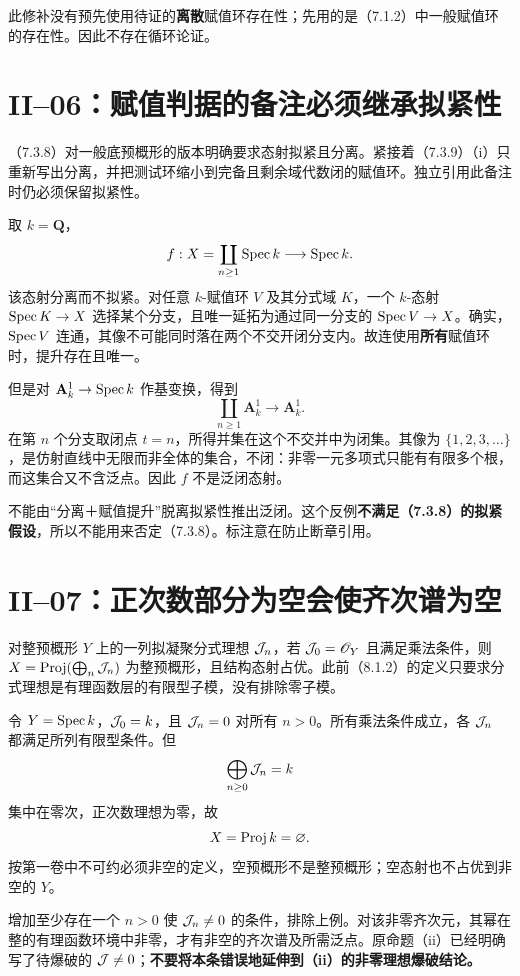 此修补没有预先使用待证的\textbf{离散}赋值环存在性；先用的是（7.1.2）中一般赋值环的存在性。因此不存在循环论证。

\section{II--06：赋值判据的备注必须继承拟紧性}
（7.3.8）对一般底预概形的版本明确要求态射拟紧且分离。紧接着（7.3.9）（i）只重新写出分离，并把测试环缩小到完备且剩余域代数闭的赋值环。独立引用此备注时仍必须保留拟紧性。
\begin{analysisproof}
取 $k=\mathbf Q$，
\[
f:X=\coprod_{n\ge1}\operatorname{Spec} k\longrightarrow\operatorname{Spec} k.
\]
该态射分离而不拟紧。对任意 $k$-赋值环 $V$ 及其分式域 $K$，一个 $k$-态射 $\operatorname{Spec} K\to X$ 选择某个分支，且唯一延拓为通过同一分支的 $\operatorname{Spec} V\to X$。确实，$\operatorname{Spec} V$ 连通，其像不可能同时落在两个不交开闭分支内。故连使用\textbf{所有}赋值环时，提升存在且唯一。

但是对 $\mathbf A^1_k\to\operatorname{Spec} k$ 作基变换，得到
\[
\coprod_{n\ge1}\mathbf A^1_k\longrightarrow\mathbf A^1_k.
\]
在第 $n$ 个分支取闭点 $t=n$，所得并集在这个不交并中为闭集。其像为 $\{1,2,3,\ldots\}$，是仿射直线中无限而非全体的集合，不闭：非零一元多项式只能有有限多个根，而这集合又不含泛点。因此 $f$ 不是泛闭态射。
\end{analysisproof}
不能由“分离＋赋值提升”脱离拟紧性推出泛闭。这个反例\textbf{不满足（7.3.8）的拟紧假设}，所以不能用来否定（7.3.8）。标注意在防止断章引用。

\section{II--07：正次数部分为空会使齐次谱为空}
对整预概形 $Y$ 上的一列拟凝聚分式理想 $\mathcal J_n$，若 $\mathcal J_0=\mathscr O_Y$ 且满足乘法条件，则 $X=\operatorname{Proj}(\bigoplus_n\mathcal J_n)$ 为整预概形，且结构态射占优。此前（8.1.2）的定义只要求分式理想是有理函数层的有限型子模，没有排除零子模。
\begin{analysisproof}
令 $Y=\operatorname{Spec} k$，$\mathcal J_0=k$，且 $\mathcal J_n=0$ 对所有 $n>0$。所有乘法条件成立，各 $\mathcal J_n$ 都满足所列有限型条件。但
\[
\bigoplus_{n\ge0}\mathcal J_n=k
\]
集中在零次，正次数理想为零，故
\[
X=\operatorname{Proj} k=\varnothing.
\]
按第一卷中不可约必须非空的定义，空预概形不是整预概形；空态射也不占优到非空的 $Y$。
\end{analysisproof}
增加至少存在一个 $n>0$ 使 $\mathcal J_n\ne0$ 的条件，排除上例。对该非零齐次元，其幂在整的有理函数环境中非零，才有非空的齐次谱及所需泛点。原命题（ii）已经明确写了待爆破的 $\mathcal J\ne0$；\textbf{不要将本条错误地延伸到（ii）的非零理想爆破结论。}

